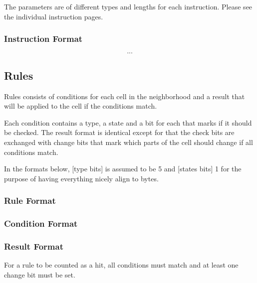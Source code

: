 \documentclass[a4paper,twoside,12pt]{article}
\begin{document}
The parameters are of different types and lengths for each instruction.
Please see the individual instruction pages.

\subsubsection*{Instruction Format}

$$...$$

\clearpage
\subsection{Rules}

Rules consists of conditions for each cell in the neighborhood and a result that will be applied to the cell if the conditions match.

Each condition contains a type, a state and a bit for each that marks if it should be checked.
The result format is identical except for that the check bits are exchanged with change bits that mark which parts of the cell should change if all conditions match.

In the formats below, [type bits] is assumed to be 5 and [states bits] 1 for the purpose of having everything nicely align to bytes.

\subsubsection*{Rule Format}


\subsubsection*{Condition Format}


\subsubsection*{Result Format}


\notes

For a rule to be counted as a hit, all conditions must match and at least one change bit must be set.
\end{document}
